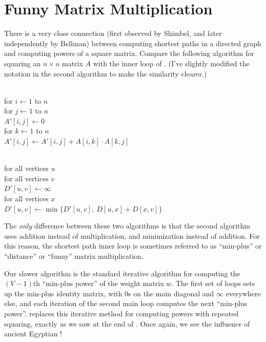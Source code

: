 \section{Funny Matrix Multiplication}
\label{sec:9.7}

There is a very close connection (first observed by Shimbel, and later independently by Bellman) between computing shortest paths in a directed graph and computing powers of a square matrix.
Compare the following algorithm for squaring an $n \times n$ matrix $A$ with the inner loop of . (I’ve slightly modified the notation in the second algorithm to make the similarity clearer.)

\begin{pseudocode}
\\
for $i \gets 1$ to $n$\\
\Indent for $j \gets 1$ to $n$\\
\Indent\Indent $A'[i, j] \gets 0$\\
\Indent\Indent for $k \gets 1$ to $n$\\
\Indent\Indent\Indent $A'[i, j] \gets A'[i, j] + A[i, k] \cdot A[k, j]$
\end{pseudocode}

\begin{pseudocode}
\\
for all vertices $u$\\
\Indent for all vertices $v$\\
\Indent\Indent $D'[u, v] \gets \infty$\\
\Indent\Indent for all vertices $x$\\
\Indent\Indent\Indent $D'[u, v] \gets \min\bigl\{D'[u, v],\ D[u, x] + D[x, v]\bigr\}$
\end{pseudocode}

The \textit{only} difference between these two algorithms is that the second algorithm uses addition instead of multiplication, and minimization instead of addition.
For this reason, the shortest path inner loop is sometimes referred to as “min-plus” or “distance” or “funny” matrix multiplication.

Our slower algorithm  is the standard iterative algorithm for computing the $(V - 1)$th “min-plus power” of the weight matrix $w$.
The first set of loops sets up the min-plus identity matrix, with $0$s on the main diagonal and $\infty$ everywhere else, and each iteration of the second main loop computes the next “min-plus power”.
 replaces this iterative method for computing powers with repeated squaring, exactly as we saw at the end of .
Once again, we see the influence of ancient Egyptian !

